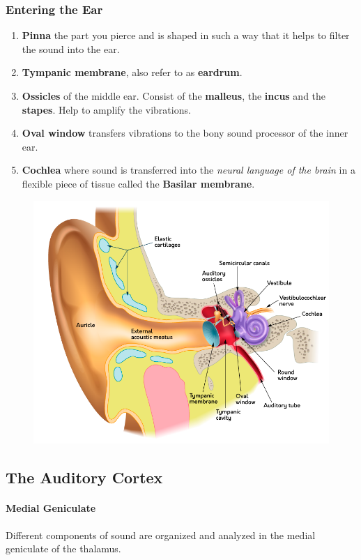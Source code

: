 \documentclass{article}
\begin{document}
	\subsubsection{Entering the Ear}
	\begin{enumerate}
		\item \textbf{Pinna} the part you pierce and is shaped in such a way that it helps to filter the sound into the ear.
		\item \textbf{Tympanic membrane}, also refer to as \textbf{eardrum}.
		\item \textbf{Ossicles} of the middle ear. Consist of the \textbf{malleus}, the \textbf{incus} and the \textbf{stapes}. Help to amplify the vibrations.
		\item \textbf{Oval window} transfers vibrations to the bony sound processor of the inner ear.
		\item \textbf{Cochlea} where sound is transferred into the \emph{neural language of the brain} in a flexible piece of tissue called the \textbf{Basilar membrane}.
	\end{enumerate}
	\begin{figure}
		\centering
		\includegraphics[width=\linewidth]{pic/ear}
	\end{figure}
	\subsection{The Auditory Cortex}
	\paragraph{Medial Geniculate} Different components of sound are organized and analyzed in the medial geniculate of the thalamus.
\end{document}
